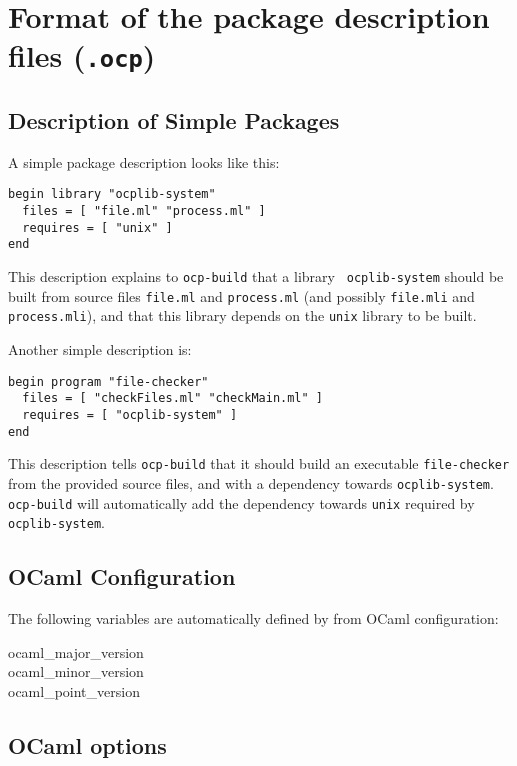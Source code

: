 \section{Format of the package description files ({\tt .ocp})}

\subsection{Description of Simple Packages}

A simple package description looks like this:

\begin{verbatim}
begin library "ocplib-system"
  files = [ "file.ml" "process.ml" ]
  requires = [ "unix" ]
end
\end{verbatim}

This description explains to {\tt ocp-build} that a library {\tt
  ocplib-system} should be built from source files {\tt file.ml} and
{\tt process.ml} (and possibly {\tt file.mli} and {\tt process.mli}),
and that this library depends on the {\tt unix} library to be built.

Another simple description is:

\begin{verbatim}
begin program "file-checker"
  files = [ "checkFiles.ml" "checkMain.ml" ]
  requires = [ "ocplib-system" ]
end
\end{verbatim}

This description tells {\tt ocp-build} that it should build an
executable {\tt file-checker} from the provided source files, and with
a dependency towards {\tt ocplib-system}. {\tt ocp-build} will
automatically add the dependency towards {\tt unix} required by {\tt
  ocplib-system}.

\subsection{OCaml Configuration}

The following variables are automatically defined by
\ocpbuild{} from OCaml configuration:
\begin{description}
\item[ocaml\_major\_version]
\item[ocaml\_minor\_version]
\item[ocaml\_point\_version]
\end{description}

\subsection{OCaml options}

